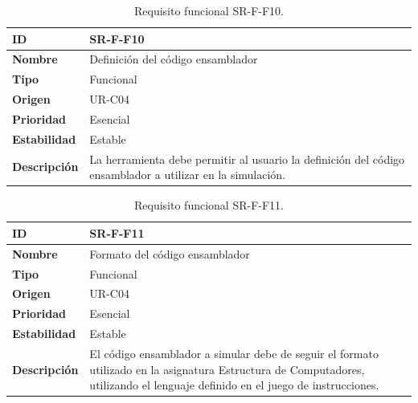 \begin{center}
\begin{table}[htbp]
\centering
\caption{Requisito funcional SR-F-F10.}
\begin{tabular}{@{}p{2.5cm} p{9cm}@{}} 
\toprule
\textbf{ID} 				& SR-F-F10 \\
\midrule
\textbf{Nombre} 			& Definición del código \gls{ensamblador}\\
\midrule
\textbf{Tipo} 			& Funcional \\
\midrule
\textbf{Origen} 			& UR-C04 \\
\midrule
\textbf{Prioridad}		& Esencial \\
\midrule
\textbf{Estabilidad} 		& Estable \\
\midrule
\textbf{Descripción} 	& La herramienta debe permitir al usuario la definición del código \gls{ensamblador} a utilizar en la simulación. \\
\bottomrule
\end{tabular}
\label{tab:srff10}
\end{table}
\end{center}

\begin{center}
\begin{table}[htbp]
\centering
\caption{Requisito funcional SR-F-F11.}
\begin{tabular}{@{}p{2.5cm} p{9cm}@{}} 
\toprule
\textbf{ID} 				& SR-F-F11 \\
\midrule
\textbf{Nombre} 			& Formato del código \gls{ensamblador}\\
\midrule
\textbf{Tipo} 			& Funcional \\
\midrule
\textbf{Origen} 			& UR-C04 \\
\midrule
\textbf{Prioridad}		& Esencial \\
\midrule
\textbf{Estabilidad} 		& Estable \\
\midrule
\textbf{Descripción} 	& El código \gls{ensamblador} a simular debe de seguir el formato utilizado en la asignatura Estructura de Computadores, utilizando el lenguaje definido en el juego de instrucciones.\\
\bottomrule
\end{tabular}
\label{tab:srff11}
\end{table}
\end{center}

